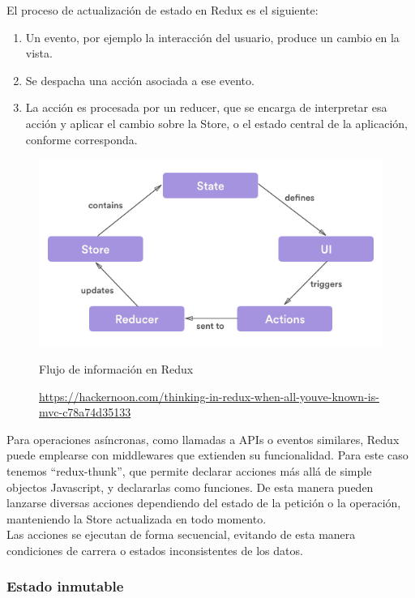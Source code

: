 El proceso de actualización de estado en Redux es el siguiente: 

\begin{enumerate}  
	\item  Un evento, por ejemplo la interacción del usuario, produce un cambio en la vista.
	\item Se despacha una acción asociada a ese evento. 
	\item La acción es procesada por un reducer, que se encarga de interpretar esa acción y aplicar el cambio sobre la Store, o el estado central de la aplicación, conforme corresponda.
\end{enumerate}

\begin{figure}[H]
	\centering
	\includegraphics[width=\textwidth]{imagenes/flujo-informacion-redux}
	\caption{Flujo de información en Redux}
	\caption*{\small \url {https://hackernoon.com/thinking-in-redux-when-all-youve-known-is-mvc-c78a74d35133}}
	\label{fig:flujo-informacion-redux}
\end{figure}

Para operaciones asíncronas, como llamadas a APIs o eventos similares, Redux puede emplearse con middlewares que extienden su funcionalidad. Para este caso tenemos \hyphenquote{spanish}{redux-thunk}, que permite declarar acciones más allá de simple objectos Javascript, y declararlas como funciones. De esta manera pueden lanzarse diversas acciones dependiendo del estado de la petición o la operación, manteniendo la Store actualizada en todo momento. \\

Las acciones se ejecutan de forma secuencial, evitando de esta manera condiciones de carrera o estados inconsistentes de los datos. \\

\subsubsection {Estado inmutable}

